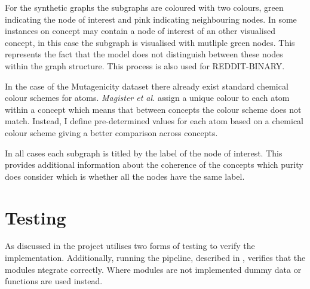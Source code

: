 For the synthetic graphs the subgraphs are coloured with two colours, green indicating the node of interest and pink indicating neighbouring nodes.
In some instances on concept may contain a node of interest of an other visualised concept, in this case the subgraph is visualised with mutliple green nodes.
This represents the fact that the model does not distinguish between these nodes within the graph structure.
This process is also used for REDDIT-BINARY\cite{Morris+2020}.

In the case of the Mutagenicity\cite{Morris+2020} dataset there already exist standard chemical colour schemes for atoms.
\textit{Magister et al.}\cite{magister2021gcexplainer} assign a unique colour to each atom within a concept which means that between concepts the colour scheme does not match.
Instead, I define pre-determined values for each atom based on a chemical colour scheme giving a better comparison across concepts.

In all cases each subgraph is titled by the label of the node of interest.
This provides additional information about the coherence of the concepts which purity does consider which is whether all the nodes have the same label.

\section{Testing}
\label{sec:testing-imp}
As discussed in  the project utilises two forms of testing to verify the implementation.
Additionally, running the pipeline, described in , verifies that the modules ntegrate correctly.
Where modules are not implemented dummy data or functions are used instead.


